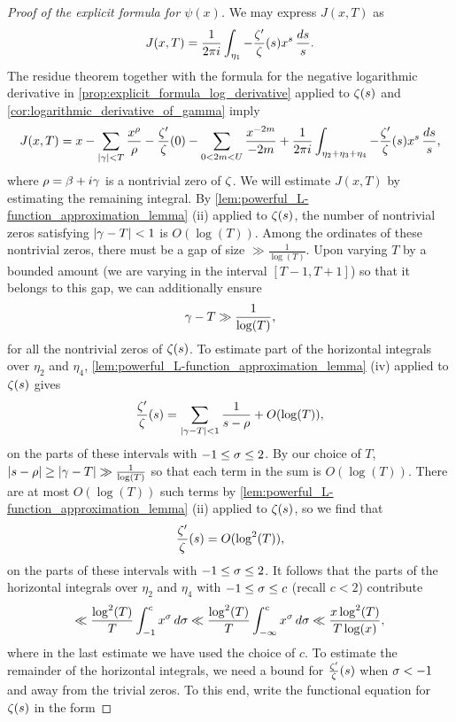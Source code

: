 \begin{proof}[Proof of the explicit formula for $\psi(x)$]
      We may express $J(x,T)$ as
      \[
        J(x,T) = \frac{1}{2\pi i}\int_{\eta_{1}}-\frac{\zeta'}{\zeta}(s)x^{s}\,\frac{ds}{s}.
      \]
      The residue theorem together with the formula for the negative logarithmic derivative in \cref{prop:explicit_formula_log_derivative} applied to $\zeta(s)$ and \cref{cor:logarithmic_derivative_of_gamma} imply
      \begin{equation}\label{equ:explicit_formula_zeta_proof_7}
        J(x,T) = x-\sum_{|\gamma| < T}\frac{x^{\rho}}{\rho}-\frac{\zeta'}{\zeta}(0)-\sum_{0 < 2m < U}\frac{x^{-2m}}{-2m}+\frac{1}{2\pi i}\int_{\eta_{2}+\eta_{3}+\eta_{4}}-\frac{\zeta'}{\zeta}(s)x^{s}\,\frac{ds}{s},
      \end{equation}
      where $\rho = \beta+i\gamma$ is a nontrivial zero of $\zeta$. We will estimate $J(x,T)$ by estimating the remaining integral. By \cref{lem:powerful_L-function_approximation_lemma} (ii) applied to $\zeta(s)$, the number of nontrivial zeros satisfying $|\gamma-T| < 1$ is $O(\log(T))$. Among the ordinates of these nontrivial zeros, there must be a gap of size $\gg \frac{1}{\log(T)}$. Upon varying $T$ by a bounded amount (we are varying in the interval $[T-1,T+1]$) so that it belongs to this gap, we can additionally ensure
      \[
        \gamma-T \gg \frac{1}{\log(T)},
      \]
      for all the nontrivial zeros of $\zeta(s)$. To estimate part of the horizontal integrals over $\eta_{2}$ and $\eta_{4}$, \cref{lem:powerful_L-function_approximation_lemma} (iv) applied to $\zeta(s)$ gives
      \[
        \frac{\zeta'}{\zeta}(s) = \sum_{|\gamma-T| < 1}\frac{1}{s-\rho}+O(\log(T)),
      \]
      on the parts of these intervals with $-1 \le \sigma \le 2$. By our choice of $T$, $|s-\rho| \ge |\gamma-T| \gg \frac{1}{\log(T)}$ so that each term in the sum is $O(\log(T))$. There are at most $O(\log(T))$ such terms by \cref{lem:powerful_L-function_approximation_lemma} (ii) applied to $\zeta(s)$, so we find that
      \[
        \frac{\zeta'}{\zeta}(s) = O(\log^{2}(T)),
      \]
      on the parts of these intervals with $-1 \le \sigma \le 2$. It follows that the parts of the horizontal integrals over $\eta_{2}$ and $\eta_{4}$ with  $-1 \le \sigma \le c$ (recall $c < 2$) contribute
      \begin{equation}\label{equ:explicit_formula_zeta_proof_8}
        \ll \frac{\log^{2}(T)}{T}\int_{-1}^{c}x^{\sigma}\,d\sigma \ll \frac{\log^{2}(T)}{T}\int_{-\infty}^{c}x^{\sigma}\,d\sigma \ll \frac{x\log^{2}(T)}{T\log(x)},
      \end{equation}
      where in the last estimate we have used the choice of $c$. To estimate the remainder of the horizontal integrals, we need a bound for $\frac{\zeta'}{\zeta}(s)$ when $\sigma < -1$ and away from the trivial zeros. To this end, write the functional equation for $\zeta(s)$ in the form

\end{proof}
